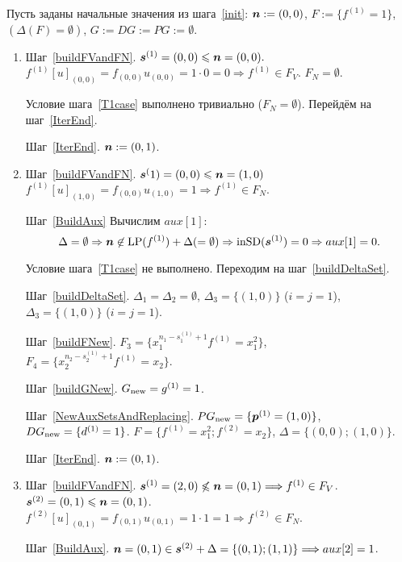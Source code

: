 \documentclass[14pt]{extarticle}
\begin{document}
Пусть заданы начальные значения из шага~\ref{init}: $\boldsymbol{n} := (0,0)$, 
$F:=\{f^{(1)}=1\}$, $(\Delta(F)=\emptyset)$, $G:=DG:=PG:=\emptyset$.
\begin{enumerate}
\renewcommand{\theenumi}{\Roman{enumi}}
\renewcommand{\theenumii}{\arabic{enumii}}
		\item
		Шаг~\ref{buildFVandFN}. $\boldsymbol{s}^{(1)}=(0,0) \leqslant \boldsymbol{n} = (0,0).$\\
		$f^{(1)}[u]_{(0,0)} = f_{(0,0)}u_{(0,0)} = 1\cdot0=0 \Longrightarrow
		f^{(1)}\in F_V$. $F_N=\emptyset$.
		
		Условие шага~\ref{T1case} выполнено тривиально ($F_N=\emptyset$). 
		Перейдём на шаг~\ref{IterEnd}.
		
		Шаг~\ref{IterEnd}. $\boldsymbol{n} := (0,1)$.
		
		\item
		Шаг~\ref{buildFVandFN}. $\boldsymbol{s}^(1) = (0,0) \leqslant \boldsymbol{n} = (1,0)$\\
		$f^{(1)}[u]_{(1,0)} = f_{(0,0)}u_{(1,0)} = 1 \Longrightarrow
		f^{(1)}\in F_N.$
		
		Шаг~\ref{BuildAux} Вычислим $aux[1]$: 
			$$ \Delta = \emptyset \Rightarrow \boldsymbol{n} \not \in \operatorname{LP}(f^{(1)}) 
			+ \Delta (= \emptyset) \Rightarrow \mathop{\mathrm{inSD}}\nolimits(\boldsymbol{s}^{(1)}) = 0 
			\Rightarrow aux[1] = 0.$$
			
		Условие шага~\ref{T1case} не выполнено. Переходим на 
		шаг~\ref{buildDeltaSet}.
		
		Шаг~\ref{buildDeltaSet}. $\Delta_1=\Delta_2=\emptyset$, $\Delta_3=\{ 
		(1,0)\}$ ($i=j=1$), $\Delta_3=\{(1,0)\}$ ($i=j=1$).
		
		Шаг~\ref{buildFNew}. $F_3=\{x_1^{n_1 - s_1^{(1)} +1}f^{(1)}=x_1^2\}$, 
		$F_4=\{x_2^{n_2 - s_2^{(1)} +1}f^{(1)}=x_2\}$.
		
		Шаг~\ref{buildGNew}. $G_{\text{new}} = {g^{(1)}=1}$.
		
		Шаг~\ref{NewAuxSetsAndReplacing}. $PG_{\text{new}}=\{\boldsymbol{p}^{(1)} = (1,0)\}$, $DG_{\text{new}} 
		= \{d^{(1)}=1\}$. $F=\{f^{(1)} = x_1^2; f^{(2)} = x_2\}$, 
		$\Delta=\{(0,0); (1,0)\}$.
		
		Шаг~\ref{IterEnd}. $\boldsymbol{n} :=(0,1)$.
		
		\item
		Шаг~\ref{buildFVandFN}. $\boldsymbol{s}^{(1)} = (2,0) \not\leqslant \boldsymbol{n}=(0,1)
		\Longrightarrow f^{(1)}\in F_V$.\\
		$\boldsymbol{s}^{(2)}=(0,1) \leqslant \boldsymbol{n} = (0,1)$.\\
		$f^{(2)}[u]_{(0,1)} = f_{(0,1)}u_{(0,1)} = 1\cdot 1=1 \Longrightarrow 
		f^{(2)}\in F_N$.
		
		Шаг~\ref{BuildAux}. $\boldsymbol{n}=(0,1) \in \boldsymbol{s}^{(2)} + \Delta = \{(0,1); 
		(1,1)\} \Longrightarrow aux[2] = 1$.
		

\end{enumerate}
\end{document}
